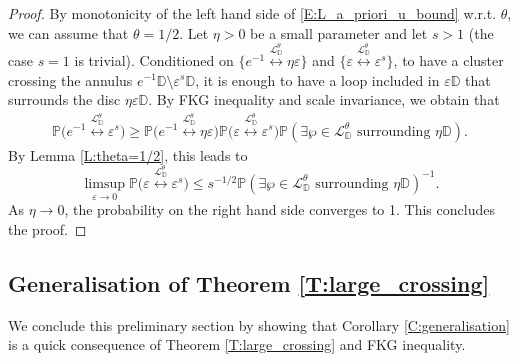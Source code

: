 \documentclass[11pt]{article}
\theoremstyle{remark}
\newcommand{\D}{\mathbb{D}}
\newcommand{\Lc}{\mathcal{L}}
\newcommand{\Prob}[1]{\mathbb{P} \left( #1 \right) }
\renewcommand{\P}{\mathbb{P}}
\newcommand{\eps}{\varepsilon}
\numberwithin{equation}{section}
\begin{document}
\begin{proof}
By monotonicity of the left hand side of \eqref{E:L_a_priori_u_bound} w.r.t. $\theta$, we can assume that $\theta =1/2$. Let $\eta >0$ be a small parameter and let $s > 1$ (the case $s=1$ is trivial).
Conditioned on $\{ e^{-1} \overset{\Lc_\D^{\theta}}{\longleftrightarrow} \eta \eps \}$ and $\{ \eps \overset{\Lc_\D^{\theta}}{\longleftrightarrow} \eps^s \}$, to have a cluster crossing the annulus $e^{-1} \D \setminus \eps^s \D$, it is enough to have a loop included in $\eps \D$ that surrounds the disc $\eta \eps \D$. By FKG inequality and scale invariance, we obtain that
\begin{align*}
\P \Big( e^{-1} \overset{\Lc_\D^{\theta}}{\longleftrightarrow} \eps^s \Big)
\geq \P \Big( e^{-1} \overset{\Lc_\D^{\theta}}{\longleftrightarrow} \eta \eps \Big) \P \Big( \eps \overset{\Lc_\D^{\theta}}{\longleftrightarrow} \eps^s \Big) \Prob{ \exists \wp \in \Lc_\D^\theta \text{~surrounding~} \eta \D }.
\end{align*}
By Lemma \ref{L:theta=1/2}, this leads to
\[
\limsup_{\eps \to 0} \P \Big( \eps \overset{\Lc_\D^\theta}{\longleftrightarrow} \eps^s \Big)
\leq s^{-1/2} \Prob{ \exists \wp \in \Lc_\D^\theta \text{~surrounding~} \eta \D}^{-1}.
\]
As $\eta \to 0$, the probability on the right hand side converges to 1. This concludes the proof.
\end{proof}


\subsection{Generalisation of Theorem \ref{T:large_crossing}}\label{SS:generalisation}

We conclude this preliminary section by showing that Corollary \ref{C:generalisation} is a quick consequence of Theorem \ref{T:large_crossing} and FKG inequality.
\end{document}

